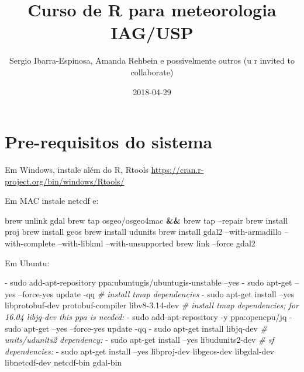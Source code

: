 \documentclass[]{book}
\title{Curso de R para meteorologia IAG/USP}
\author{Sergio Ibarra-Espinosa, Amanda Rehbein e possivelmente outros (u r
invited to collaborate)}
\date{2018-04-29}
\newenvironment{Shaded}{\begin{snugshade}}{\end{snugshade}}
\newcommand{\KeywordTok}[1]{\textcolor[rgb]{0.13,0.29,0.53}{\textbf{#1}}}
\newcommand{\CommentTok}[1]{\textcolor[rgb]{0.56,0.35,0.01}{\textit{#1}}}
\newcommand{\ExtensionTok}[1]{#1}
\newcommand{\NormalTok}[1]{#1}
\theoremstyle{definition}
\theoremstyle{definition}
\theoremstyle{definition}
\theoremstyle{remark}
\begin{document}
\maketitle

{
\setcounter{tocdepth}{1}
\tableofcontents
}
\chapter{Pre-requisitos do sistema}\label{primero}

Em Windows, instale além do R, Rtools
\url{https://cran.r-project.org/bin/windows/Rtools/}

Em MAC instale netcdf e:

\begin{Shaded}
\begin{Highlighting}[]
\ExtensionTok{brew}\NormalTok{ unlink gdal}
\ExtensionTok{brew}\NormalTok{ tap osgeo/osgeo4mac }\KeywordTok{&&} \ExtensionTok{brew}\NormalTok{ tap --repair}
\ExtensionTok{brew}\NormalTok{ install proj}
\ExtensionTok{brew}\NormalTok{ install geos}
\ExtensionTok{brew}\NormalTok{ install udunits}
\ExtensionTok{brew}\NormalTok{ install gdal2 --with-armadillo --with-complete --with-libkml --with-unsupported}
\ExtensionTok{brew}\NormalTok{ link --force gdal2}
\end{Highlighting}
\end{Shaded}

Em Ubuntu:

\begin{Shaded}
\begin{Highlighting}[]
  \ExtensionTok{-}\NormalTok{ sudo add-apt-repository ppa:ubuntugis/ubuntugis-unstable --yes}
  \ExtensionTok{-}\NormalTok{ sudo apt-get --yes --force-yes update -qq}
  \CommentTok{# install tmap dependencies}
  \ExtensionTok{-}\NormalTok{ sudo apt-get install --yes libprotobuf-dev protobuf-compiler libv8-3.14-dev}
  \CommentTok{# install tmap dependencies; for 16.04 libjq-dev this ppa is needed:}
  \ExtensionTok{-}\NormalTok{ sudo add-apt-repository -y ppa:opencpu/jq}
  \ExtensionTok{-}\NormalTok{ sudo apt-get --yes --force-yes update -qq}
  \ExtensionTok{-}\NormalTok{ sudo apt-get install libjq-dev}
  \CommentTok{# units/udunits2 dependency:}
  \ExtensionTok{-}\NormalTok{ sudo apt-get install --yes libudunits2-dev}
  \CommentTok{# sf dependencies:}
  \ExtensionTok{-}\NormalTok{ sudo apt-get install --yes libproj-dev libgeos-dev libgdal-dev libnetcdf-dev  netcdf-bin gdal-bin}
\end{Highlighting}
\end{Shaded}
\end{document}
